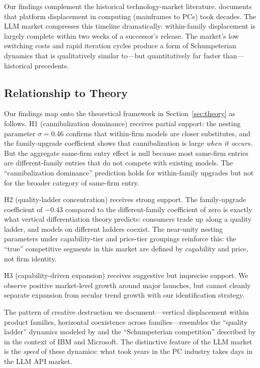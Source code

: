 \documentclass[11pt, a4paper]{article}
\begin{document}
Our findings complement the historical technology-market literature. \citet{bresnahan1999technological} documents that platform displacement in computing (mainframes to PCs) took decades. The LLM market compresses this timeline dramatically: within-family displacement is largely complete within two weeks of a successor's release. The market's low switching costs and rapid iteration cycles produce a form of Schumpeterian dynamics that is qualitatively similar to---but quantitatively far faster than---historical precedents.

\subsection{Relationship to Theory}

Our findings map onto the theoretical framework in Section~\ref{sec:theory} as follows. H1 (cannibalization dominance) receives partial support: the nesting parameter $\sigma = 0.46$ confirms that within-firm models are closer substitutes, and the family-upgrade coefficient shows that cannibalization is large \emph{when it occurs}. But the aggregate same-firm entry effect is null because most same-firm entries are different-family entries that do not compete with existing models. The ``cannibalization dominance'' prediction holds for within-family upgrades but not for the broader category of same-firm entry.

H2 (quality-ladder concentration) receives strong support. The family-upgrade coefficient of $-0.43$ compared to the different-family coefficient of zero is exactly what vertical differentiation theory predicts: consumers trade up along a quality ladder, and models on different ladders coexist. The near-unity nesting parameters under capability-tier and price-tier groupings reinforce this: the ``true'' competitive segments in this market are defined by capability and price, not firm identity.

H3 (capability-driven expansion) receives suggestive but imprecise support. We observe positive market-level growth around major launches, but cannot cleanly separate expansion from secular trend growth with our identification strategy.

The pattern of creative destruction we document---vertical displacement within product families, horizontal coexistence across families---resembles the ``quality ladder'' dynamics modeled by \citet{baron2020vertical} and the ``Schumpeterian competition'' described by \citet{bresnahan2011schumpeterian} in the context of IBM and Microsoft. The distinctive feature of the LLM market is the \emph{speed} of these dynamics: what took years in the PC industry takes days in the LLM API market.
\end{document}
